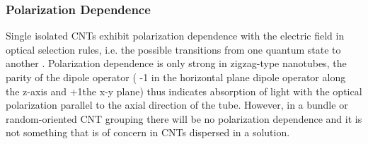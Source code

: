 \subsubsection{Polarization Dependence}
Single isolated CNTs exhibit polarization dependence with the electric field in optical selection rules, i.e. the possible transitions from one quantum state to another \cite{thomsen}. Polarization dependence is only strong in zigzag-type nanotubes, the parity of the  dipole operator ( -1 in the horizontal plane dipole operator along the z-axis and +1the x-y plane) thus indicates absorption of light with the optical polarization parallel to the axial direction of the tube. However, in a bundle or random-oriented CNT grouping there will be no polarization dependence and it is not something that is of concern in CNTs dispersed in a solution.

